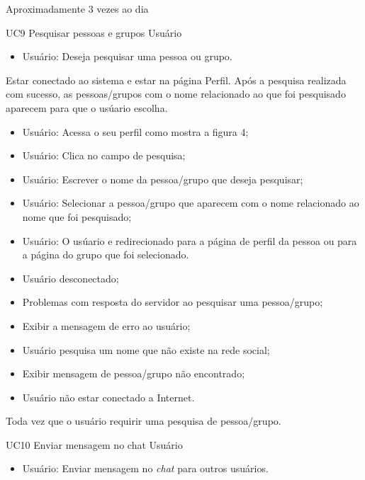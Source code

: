 {Aproximadamente 3 vezes ao dia}
{

}
\casoDeUso
{UC9}
{Pesquisar pessoas e grupos}
{Usuário}
{
\begin{itemize}
	\item Usuário: Deseja pesquisar uma pessoa ou grupo.	
\end{itemize}
}
{Estar conectado ao sistema e estar na página Perfil.}
{Após a pesquisa realizada com sucesso, as pessoas/grupos com o nome relacionado ao que foi pesquisado aparecem para que o usúario escolha.}
{
\begin{itemize}
	\item Usuário: Acessa o seu perfil como mostra a figura 4;
	\item Usuário: Clica no campo de pesquisa;
	\item Usuário: Escrever o nome da pessoa/grupo que deseja pesquisar;
	\item Usuário: Selecionar a pessoa/grupo que aparecem com o nome relacionado ao nome que foi pesquisado;
	\item Usuário: O usúario e redirecionado para a página de perfil da pessoa ou para a página do grupo que foi selecionado.
\end{itemize}
}
{
\begin{itemize}
	\item Usuário desconectado;
	\item Problemas com resposta do servidor ao pesquisar uma pessoa/grupo;
	\item Exibir a mensagem de erro ao usuário;
	\item Usuário pesquisa um nome que não existe na rede social;
	\item Exibir mensagem de pessoa/grupo não encontrado;
	\item Usuário não estar conectado a Internet.
\end{itemize}
}
{Toda vez que o usuário requirir uma pesquisa de pessoa/grupo.}
{

}
\casoDeUso
{UC10}
{Enviar mensagem no chat}
{Usuário}
{
\begin{itemize}
	\item Usuário: Enviar mensagem no \textit{chat} para outros usuários.
	
\end{itemize}

}
